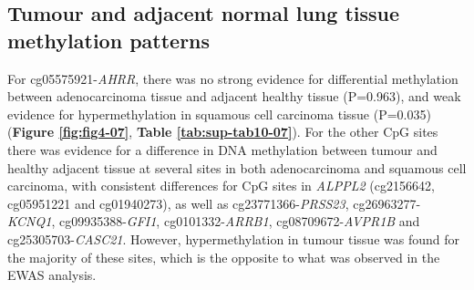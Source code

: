\documentclass[11pt,oneside]{bristolthesis}
\begin{document}
\hypertarget{lc-heathly-v-normal}{%
\subsection{Tumour and adjacent normal lung tissue methylation patterns}\label{lc-heathly-v-normal}}

For cg05575921-\emph{AHRR}, there was no strong evidence for differential methylation between adenocarcinoma tissue and adjacent healthy tissue (P=0.963), and weak evidence for hypermethylation in squamous cell carcinoma tissue (P=0.035) (\textbf{Figure \ref{fig:fig4-07}}, \textbf{Table \ref{tab:sup-tab10-07}}). For the other CpG sites there was evidence for a difference in DNA methylation between tumour and healthy adjacent tissue at several sites in both adenocarcinoma and squamous cell carcinoma, with consistent differences for CpG sites in \emph{ALPPL2} (cg2156642, cg05951221 and cg01940273), as well as cg23771366-\emph{PRSS23}, cg26963277-\emph{KCNQ1}, cg09935388-\emph{GFI1}, cg0101332-\emph{ARRB1}, cg08709672-\emph{AVPR1B} and cg25305703-\emph{CASC21}. However, hypermethylation in tumour tissue was found for the majority of these sites, which is the opposite to what was observed in the EWAS analysis.
\end{document}
